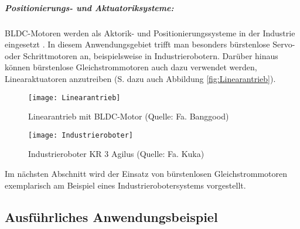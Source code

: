 \subparagraph{Positionierungs- und Aktuatoriksysteme:} BLDC-Motoren werden als Aktorik- und Positionierungssysteme in der Industrie eingesetzt \parencite[S. 159]{Gopal2002}. In diesem Anwendungsgebiet trifft man besonders bürstenlose Servo- oder Schrittmotoren an, beispielsweise in Industrierobotern. Darüber hinaus können bürstenlose Gleichstrommotoren auch dazu verwendet werden, Linearaktuatoren anzutreiben \parencite[S. 91]{Zhang2013} (S.  dazu auch Abbildung \ref{fig:Linearantrieb}).

\begin{figure}[H]
  \begin{minipage}{.47\textwidth}
    \centering
    \texttt{[image: Linearantrieb]}
    \caption[Linearantrieb mit BLDC-Motor]{Linearantrieb mit BLDC-Motor (Quelle: Fa. Banggood)}
    \label{fig:Linearantrieb}
  \end{minipage}\hfill%
  \begin{minipage}{.47\textwidth}
    \centering
    \texttt{[image: Industrieroboter]}
    \caption[Industrieroboter KR 3 Agilus]{Industrieroboter KR 3 Agilus (Quelle: Fa. Kuka)}
    \label{fig:Industrieroboter}
  \end{minipage}
\end{figure}

Im nächsten Abschnitt wird der Einsatz von bürstenlosen Gleichstrommotoren exemplarisch am Beispiel eines Industrierobotersystems vorgestellt.

\subsection{Ausführliches Anwendungsbeispiel}

